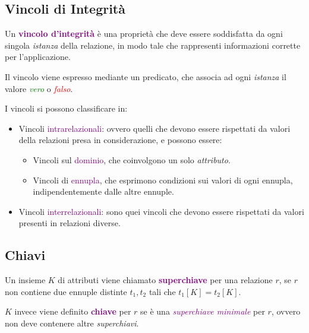 \subsection{Vincoli di Integrità}
Un \textbf{\textcolor{purple}{vincolo d'integrità}} è una proprietà che deve
essere soddisfatta da ogni singola \emph{istanza} della relazione, in modo tale che rappresenti informazioni
corrette per l'applicazione.

Il vincolo viene espresso mediante un predicato, che associa ad ogni \emph{istanza} il valore \emph{\textcolor{Green}{vero}}
o \emph{\textcolor{red}{falso}}.

I vincoli si possono classificare in:
\begin{itemize}
    \item Vincoli \textcolor{purple}{intrarelazionali}: ovvero quelli che devono essere rispettati da valori della relazioni presa in considerazione, e possono essere:
        \begin{itemize}
            \item Vincoli sul \textcolor{purple}{dominio}, che coinvolgono un solo \emph{attributo}.
            \item Vincoli di \textcolor{purple}{ennupla}, che esprimono condizioni sui valori di ogni ennupla, indipendentemente dalle altre ennuple.
        \end{itemize}
    \item Vincoli \textcolor{purple}{interrelazionali}: sono quei vincoli che devono essere rispettati da valori presenti in relazioni diverse.
\end{itemize}

\subsection{Chiavi}

\begin{definition}[Superchiave]
    Un insieme $K$ di attributi viene chiamato \textbf{\textcolor{purple}{superchiave}} per una
    relazione $r$, se $r$ non contiene due ennuple distinte $t_1, t_2$ tali che $t_1[K] = t_2[K]$.
\end{definition}

\begin{definition}[Chiave]
    $K$ invece viene definito \textbf{\textcolor{purple}{chiave}} per $r$ se è una \emph{\textcolor{purple}{superchiave minimale}} per $r$, ovvero
    non deve contenere altre \emph{superchiavi}.
\end{definition}